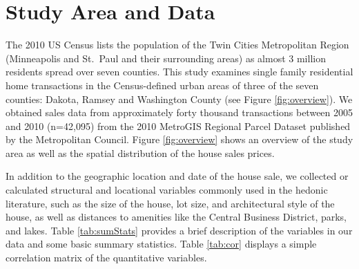 \documentclass{article}\usepackage[]{graphicx}\usepackage[]{color}
\begin{document}
\section{Study Area and Data}
The 2010 US Census lists the population of the Twin Cities Metropolitan Region (Minneapolis and St.\ Paul and their surrounding areas) as almost 3 million residents spread over seven counties. This study examines single family residential home transactions in the Census-defined urban areas of three of the seven counties: Dakota, Ramsey and Washington County (see Figure \ref{fig:overview}). We obtained sales data from approximately forty thousand transactions between 2005 and 2010 (n=42,095) from the 2010 MetroGIS Regional Parcel Dataset published by the Metropolitan Council. Figure \ref{fig:overview} shows an overview of the study area as well as the spatial distribution of the house sales prices. 

In addition to the geographic location and date of the house sale, we collected or calculated structural and locational variables commonly used in the hedonic literature, such as the size of the house, lot size, and architectural style of the house, as well as distances to amenities like the Central Business District, parks, and lakes. Table \ref{tab:sumStats} provides a brief description of the variables in our data and some basic summary statistics. Table \ref{tab:cor} displays a simple correlation matrix of the quantitative variables.
\end{document}
